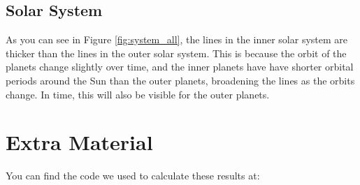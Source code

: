 \documentclass[10pt,showpacs,preprintnumbers,footinbib,amsmath,amssymb,aps,prl,twocolumn,groupedaddress,superscriptaddress,showkeys]{revtex4-1}
\begin{document}
\subsection{Solar System}

As you can see in Figure \ref{fig:system_all}, the lines in the inner solar system are thicker than the lines in the outer solar system. This is because the orbit of the planets change slightly over time, and the inner planets have have shorter orbital periods around the Sun than the outer planets, broadening the lines as the orbits change. In time, this will also be visible for the outer planets. 



\section{Extra Material}
You can find the code we used to calculate these results at: 

\begin{thebibliography}{99}
\end{thebibliography}
\end{document}
